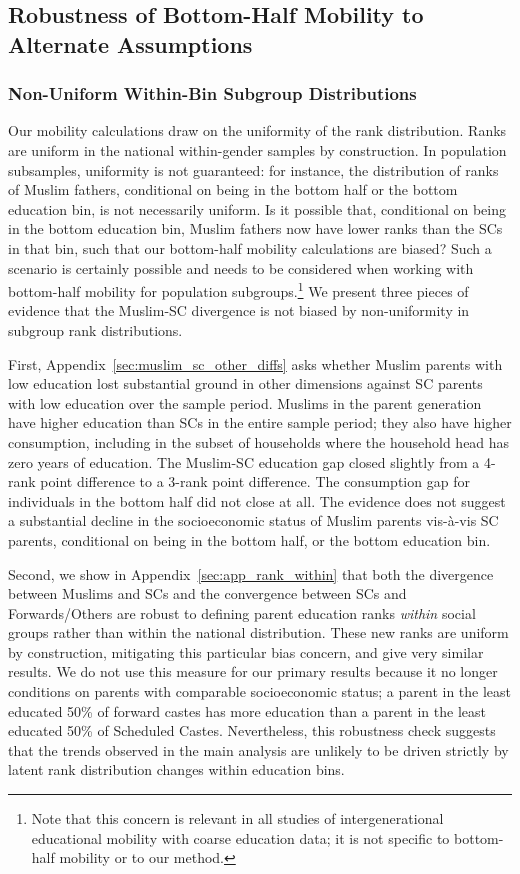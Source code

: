 \documentclass[12pt,letterpaper]{article}
\numberwithin{equation}{section}
\begin{document}
\subsection{Robustness of Bottom-Half Mobility to Alternate Assumptions}
\label{sec:rob} 

\subsubsection{Non-Uniform Within-Bin Subgroup Distributions}
\label{sec:within_bin}

Our mobility calculations draw on the uniformity of the rank distribution. Ranks are uniform in the national within-gender samples by construction. In population subsamples, uniformity is not guaranteed: for instance, the distribution of ranks of Muslim fathers, conditional on being in the bottom half or the bottom education bin, is not necessarily uniform. Is it possible that, conditional on being in the bottom education bin, Muslim fathers now have lower ranks than the SCs in that bin, such that our bottom-half mobility calculations are biased? Such a scenario is certainly possible and needs to be considered when working with bottom-half mobility for population subgroups.\footnote{Note that this concern is relevant in all studies of intergenerational educational mobility with coarse education data; it is not specific to bottom-half mobility or to our method.} We present three pieces of evidence that the Muslim-SC divergence is not biased by non-uniformity in subgroup rank distributions.

First, Appendix~\ref{sec:muslim_sc_other_diffs} asks whether Muslim parents with low education lost substantial ground in other dimensions against SC parents with low education over the sample period. Muslims in the parent generation have higher education than SCs in the entire sample period; they also have higher consumption, including in the subset of households where the household head has zero years of education. The Muslim-SC education gap closed slightly from a 4-rank point difference to a 3-rank point difference. The consumption gap for individuals in the bottom half did not close at all. The evidence does not suggest a substantial decline in the socioeconomic status of Muslim parents vis-\`{a}-vis SC parents, conditional on being in the bottom half, or the bottom education bin.

Second, we show in Appendix~\ref{sec:app_rank_within} that both the divergence between Muslims and SCs and the convergence between SCs and Forwards/Others are robust to defining parent education ranks \textit{within} social groups rather than within the national distribution. These new ranks are uniform by construction, mitigating this particular bias concern, and give very similar results. We do not use this measure for our primary results because it no longer conditions on parents with comparable socioeconomic status; a parent in the least educated 50\% of forward castes has more education than a parent in the least educated 50\% of Scheduled Castes. Nevertheless, this robustness check suggests that the trends observed in the main analysis are unlikely to be driven strictly by latent rank distribution changes within education bins. 
\end{document}
